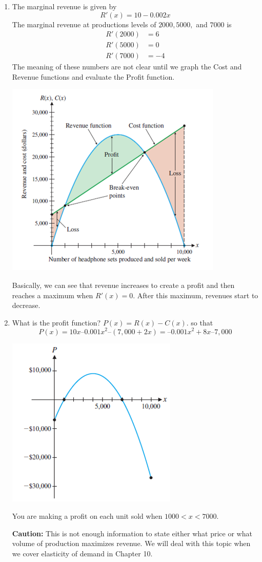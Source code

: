 \documentclass[14pt]{extarticle}
\begin{document}
\begin{enumerate}
\item The marginal revenue is given by $$R'(x) = 10 - 0.002x$$
The marginal revenue at productions levels of $2000, 5000,$ and $7000$ is
\begin{align*}
	R'(2000) &= 6 \\
	R'(5000) &= 0 \\
	R'(7000) &= -4 
\end{align*}
The meaning of these numbers are not clear until we graph the Cost and Revenue functions and evaluate the Profit function.
\begin{center}
	\includegraphics[width=0.7\linewidth]{9-7-20a}
\end{center}
Basically, we can see that revenue increases to create a profit and then reaches a maximum when $R'(x) = 0$. After this maximum, revenues start to decrease.

\item What is the profit function? $P(x) = R(x) - C(x)$. so that 
$$P(x) = 10x – 0.001x^2 – (7,000 + 2x) = –0.001x^2 + 8x – 7,000$$
\begin{center}
	\includegraphics[width=0.5\linewidth]{9-7-20b}
\end{center}
You are making a profit on each unit sold when $1000 < x < 7000$.

\begin{tcolorbox}[enhanced jigsaw,colback=bg,boxrule=0pt,arc=0pt]
	\textbf{Caution:} This is not enough information to state either what price or what volume of production maximizes revenue. We will deal with this topic when we cover elasticity of demand in Chapter 10.
\end{tcolorbox}

\end{enumerate}
\end{document}
